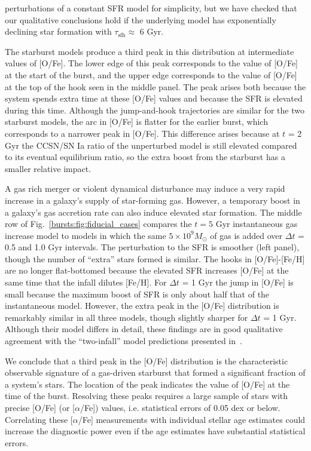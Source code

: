 perturbations of a constant SFR model for simplicity, but we have checked that 
our qualitative conclusions hold if the underlying model has exponentially 
declining star formation with $\tau_\text{sfh}\approx$ 6 Gyr. 
\par 
The starburst models produce a third peak in this distribution at intermediate 
values of [O/Fe]. The lower edge of this peak corresponds to the value of 
[O/Fe] at the start of the burst, and the upper edge corresponds to the value 
of [O/Fe] at the top of the hook seen in the middle panel. The peak arises both 
because the system spends extra time at these [O/Fe] values and because the 
SFR is elevated during this time. Although the jump-and-hook trajectories are 
similar for the two starburst models, the arc in [O/Fe] is flatter for the 
earlier burst, which corresponds to a narrower peak in [O/Fe]. This difference 
arises because at $t$ = 2 Gyr the CCSN/SN Ia ratio of the unperturbed model is 
still elevated compared to its eventual equilibrium ratio, so the extra boost 
from the starburst has a smaller relative impact. 
\par 
A gas rich merger or violent dynamical disturbance may induce a very rapid 
increase in a galaxy's supply of star-forming gas. However, a temporary boost 
in a galaxy's gas accretion rate can also induce elevated star formation. 
The middle row of Fig.~\ref{bursts:fig:fiducial_cases} compares the $t = 5$ Gyr 
instantaneous gas increase model to models in which the same 
$5\times10^9 M_\odot$ of gas is added over $\Delta t$ = 0.5 and 1.0 Gyr 
intervals. The perturbation to the SFR is smoother (left panel), though the 
number of ``extra'' stars formed is similar. The hooks in [O/Fe]-[Fe/H] are no 
longer flat-bottomed because the elevated SFR increases [O/Fe] at the same 
time that the infall dilutes [Fe/H]. For $\Delta t$ = 1 Gyr the jump in [O/Fe] 
is small because the maximum boost of SFR is only about half that of the 
instantaneous model. However, the extra peak in the [O/Fe] distribution is 
remarkably similar in all three models, though slightly sharper for 
$\Delta t$ = 1 Gyr. 
Although their model differs in detail, these findings are in good qualitative 
agreement with the ``two-infall'' model predictions presented 
in~\citet{Spitoni2019}. 
\par 
We conclude that a third peak in the [O/Fe] distribution is the characteristic 
observable signature of a gas-driven starburst that formed a significant 
fraction of a system's stars. The location of the peak indicates the value of 
[O/Fe] at the time of the burst. Resolving these peaks requires a large sample 
of stars with precise [O/Fe] (or [$\alpha$/Fe]) values, i.e. statistical errors 
of 0.05 dex or below. Correlating these [$\alpha$/Fe] measurements with 
individual stellar age estimates could increase the diagnostic power even if 
the age estimates have substantial statistical errors. 


